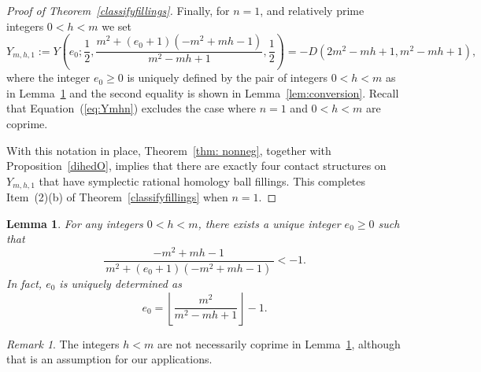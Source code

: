 \documentclass[11pt]{amsart}
\theoremstyle{plain}
\newtheorem{lemma}[theorem]{Lemma}
\theoremstyle{definition}
\theoremstyle{remark}
\newtheorem{remark}[theorem]{Remark}
\numberwithin{theorem}{section}
\begin{document}
\begin{proof}[Proof of Theorem~\ref{classifyfillings}]
Finally, for $n=1$, and relatively prime integers $0 < h < m$  we set 
$$
Y_{m,h,1}:=Y\left(e_0; \dfrac{1}{2}, \dfrac{m^2+(e_0+1)(-m^2+mh-1)}{m^2-mh+1}, \dfrac{1}{2}\right)=-D(2m^2-mh+1, m^2-mh+1),
$$ 
where the integer $e_0 \geq 0$ is uniquely defined by the pair of integers $0 < h < m$ as in Lemma~\ref{lem:unique-e0} and the second equality is shown in Lemma~\ref{lem:conversion}. Recall that Equation~(\ref{eq:Ymhn}) excludes the case where $n=1$ and $0 < h < m$ are coprime. 

With this notation in place, Theorem~\ref{thm: nonneg}, together with Proposition~\ref{dihedO}, implies that there are exactly four contact structures on  $Y_{m, h, 1}$ that have symplectic rational homology ball fillings. This completes Item~(2)(b) of Theorem~\ref{classifyfillings} when $n=1$.
\end{proof}

\begin{lemma}\label{lem:unique-e0}
For any integers $0 < h < m$, 
there exists a unique integer $e_{0}\ge 0$ such that
\begin{equation}\label{eq:ineq-original}
\frac{-m^{2}+mh-1}{\,m^{2}+(e_{0}+1)(-m^{2}+mh-1)\,}< -1 .
\end{equation}
In fact, $e_{0}$ is uniquely determined as
\begin{equation}\label{eq:e0-formula}
e_{0}=\left\lfloor \frac{m^{2}}{m^{2}-mh+1}\right\rfloor-1.
\end{equation}
\end{lemma}

\begin{remark} The integers  $h < m$ are not necessarily coprime in Lemma~\ref{lem:unique-e0}, although that is an assumption for our applications. 
\end{remark}
\end{document}
